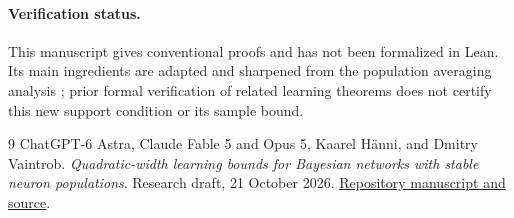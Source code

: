 \documentclass[11pt]{article}
\begin{document}
\paragraph{Verification status.}
This manuscript gives conventional proofs and has not been formalized in
Lean. Its main ingredients are adapted and sharpened from the population
averaging analysis \cite{averaging}; prior formal verification of related
learning theorems does not certify this new support condition or its
sample bound.

\begin{thebibliography}{9}
ChatGPT-6 Astra, Claude Fable 5 and Opus 5, Kaarel H\"anni, and Dmitry Vaintrob.
\emph{Quadratic-width learning bounds for Bayesian networks with stable
neuron populations}. Research draft, 21 October 2026.
\href{https://github.com/kaarelh/AI-works/tree/main/neural-network-generalization/works-in-progress/improved-polynomials/neuron-averaging}{Repository manuscript and source}.
\end{thebibliography}
\end{document}
